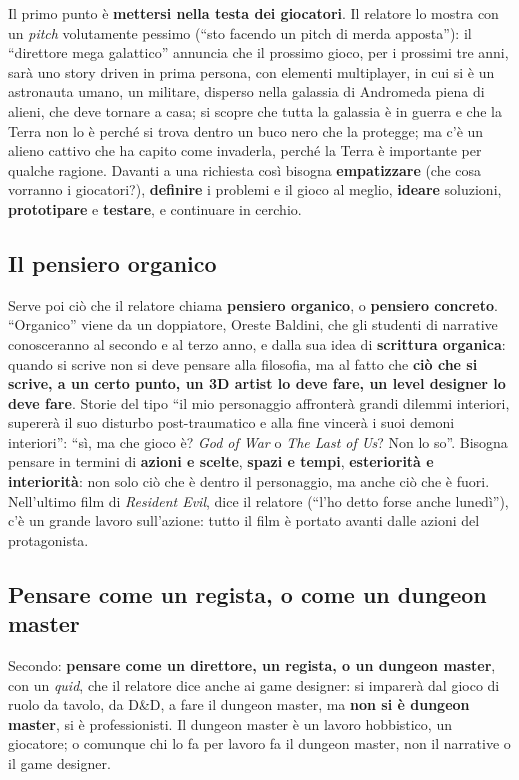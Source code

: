 Il primo punto è \textbf{mettersi nella testa dei giocatori}. Il relatore lo
mostra con un \emph{pitch} volutamente pessimo (``sto facendo un pitch di
merda apposta''): il ``direttore mega galattico'' annuncia che il prossimo
gioco, per i prossimi tre anni, sarà uno story driven in prima persona, con
elementi multiplayer, in cui si è un astronauta umano, un militare, disperso
nella galassia di Andromeda piena di alieni, che deve tornare a casa; si
scopre che tutta la galassia è in guerra e che la Terra non lo è perché si
trova dentro un buco nero che la protegge; ma c'è un alieno cattivo che ha
capito come invaderla, perché la Terra è importante per qualche ragione.
Davanti a una richiesta così bisogna \textbf{empatizzare} (che cosa
vorranno i giocatori?), \textbf{definire} i problemi e il gioco al meglio,
\textbf{ideare} soluzioni, \textbf{prototipare} e \textbf{testare}, e
continuare in cerchio.

\subsection{Il pensiero organico}

Serve poi ciò che il relatore chiama \textbf{pensiero organico}, o
\textbf{pensiero concreto}. ``Organico'' viene da un doppiatore, Oreste
Baldini, che gli studenti di narrative conosceranno al secondo e al terzo
anno, e dalla sua idea di \textbf{scrittura organica}: quando si scrive non
si deve pensare alla filosofia, ma al fatto che \textbf{ciò che si scrive, a
un certo punto, un 3D artist lo deve fare, un level designer lo deve fare}.
Storie del tipo ``il mio personaggio affronterà grandi dilemmi interiori,
supererà il suo disturbo post-traumatico e alla fine vincerà i suoi demoni
interiori'': ``sì, ma che gioco è? \emph{God of War} o \emph{The Last of
Us}? Non lo so''. Bisogna pensare in termini di \textbf{azioni e scelte},
\textbf{spazi e tempi}, \textbf{esteriorità e interiorità}: non solo ciò che è
dentro il personaggio, ma anche ciò che è fuori. Nell'ultimo film di
\emph{Resident Evil}, dice il relatore (``l'ho detto forse anche lunedì''),
c'è un grande lavoro sull'azione: tutto il film è portato avanti dalle azioni
del protagonista.

\subsection{Pensare come un regista, o come un dungeon master}

Secondo: \textbf{pensare come un direttore, un regista, o un dungeon master},
con un \emph{quid}, che il relatore dice anche ai game designer: si imparerà
dal gioco di ruolo da tavolo, da D\&D, a fare il dungeon master, ma
\textbf{non si è dungeon master}, si è professionisti. Il dungeon master è un
lavoro hobbistico, un giocatore; o comunque chi lo fa per lavoro fa il dungeon
master, non il narrative o il game designer.

